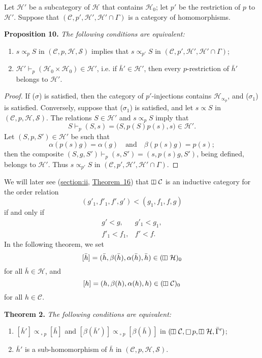 \documentclass[a4paper,oneside,nobib,nofonts,notitlepage,notoc,nols,fleqn,justified]{tufte-book}
\newenvironment{itenv}[1]
  {\phantomsection\par\medskip\noindent\textbf{#1.}\itshape}
  {\par\medskip}
\newcommand{\oldpage}[1]{{\reversemarginpar\marginnote{\raggedleft\footnotesize\textit{p.~#1}}}}
\newcommand{\CC}{\mathcal{C}}
\newcommand{\HH}{\mathcal{H}}
\renewcommand{\SS}{\mathcal{S}}
\newcommand{\subs}{\mathrel{\propto}}
\DeclareMathOperator{\sq}{\square}
\DeclareMathOperator{\vsq}{\raisebox{-.1em}{\rotatebox{90}{$\boxminus$}\,}}
\begin{document}
Let $\HH'$ be a subcategory of $\HH$ that contains $\HH_0$;
let $p'$ be the restriction of $p$ to $\HH'$.
Suppose that $(\CC,p',\HH',\HH'\cap\Gamma)$ is a category of homomorphisms.

\begin{itenv}{Proposition 10}
\label{proposition:i-10}
  The following conditions are equivalent:

  \begin{enumerate}
    \item[\normalfont($\sigma$)] $s\subs_p S$ in $(\CC,p,\HH,\SS)$ implies that $s\subs_{p'}S$ in $(\CC,p',\HH',\HH'\cap\Gamma)$;

    \item[\normalfont($\sigma_1$)] $\HH'\vdash_p(\HH_0\times\HH_0)\in\HH'$, i.e. if $\bar{h}'\in\HH'$, then every $p$-restriction of $\bar{h}'$ belongs to $\HH'$.
  \end{enumerate}
\end{itenv}

\begin{proof}
  If ($\sigma$) is satisfied, then the category of $p'$-injections contains $\HH_{\subs_p}$, and ($\sigma_1$) is satisfied.
  Conversely, suppose that ($\sigma_1$) is satisfied, and let $s\subs S$ in $(\CC,p,\HH,\SS)$.
  The relations $S\in\HH'$ and $s\subs_p S$ imply that
  \[
    S\vdash_p(S,s)
    = \big(
      S,p(S)p(s),s
    \big) \in \HH'.
  \]
  Let $(S,p,S')\in\HH'$ be such that
  \[
    \alpha(p(s)g) = \alpha(g)
    \quad\text{and}\quad
    \beta(p(s)g) = p(s);
  \]
  then the composite $(S,g,S')\vdash_p(s,S')=(s,p(s)g,S')$, being defined, belongs to $\HH'$.
  Thus $s\subs_{p'}S$ in $(\CC,p',\HH',\HH'\cap\Gamma)$.
\end{proof}

We will later see (\hyperref[§II]{section:ii}, \hyperref[theorem:16]{Theorem~16}) that $\vsq\CC$ is an inductive category for the order relation
\[
  (g'_1,f'_1,f',g')
  < (g_1,f_1,f,g)
\]
\oldpage{368}
if and only if
\[
  \begin{array}{ll}
    g'<g,
    & g'_1<g_1,
  \\f'_1<f_1,
    & f'<f.
  \end{array}
\]
In the following theorem, we set
\[
  [\bar{h}]
  = (\bar{h},\beta(\bar{h}),\alpha(\bar{h}),\bar{h})
  \in (\vsq\HH)_0
\]
for all $\bar{h}\in\HH$, and
\[
  [h]
  = (h,\beta(h),\alpha(h),h)
  \in (\vsq\CC)_0
\]
for all $h\in\CC$.

\begin{itenv}{Theorem 2}
\label{theorem:2}
  The following conditions are equivalent:
  \begin{enumerate}
    \item[\normalfont(1)] $[\bar{h}']\subs_{\sq p}[\bar{h}]$ and $[\beta(\bar{h}')]\subs_{\sq p}[\beta(\bar{h})]$ in $(\vsq\CC,\sq p,\vsq\HH,\bar{\Gamma}')$;
    \item[\normalfont(2)] $\bar{h}'$ is a sub-homomorphism of $\bar{h}$ in $(\CC,p,\HH,\SS)$.
  \end{enumerate}
\end{itenv}
\end{document}
